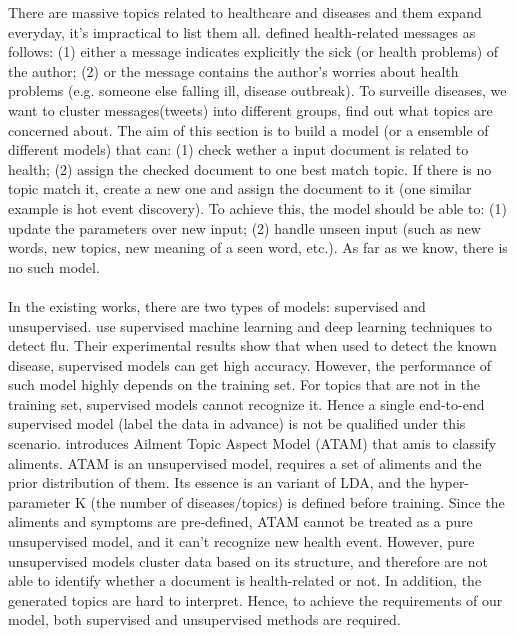 \label{sec:uncoverig}
There are massive topics related to healthcare and diseases and them expand everyday, it's impractical to list them all. \cite{tuarob2013discovering} defined health-related messages as follows: (1) either a message indicates explicitly the sick (or health problems) of the author; (2) or the message contains the author's worries about health problems (e.g. someone else falling ill, disease outbreak). To surveille diseases, we want to cluster messages(tweets) into different groups, find out what topics are concerned about. The aim of this section is to build a model (or a ensemble of different models) that can: (1) check wether a input document is related to health; (2) assign the checked document to one best match topic. If there is no topic match it, create a new one and assign the document to it (one similar example is hot event discovery). To achieve this, the model should be able to: (1) update the parameters over new input; (2) handle unseen input (such as new words, new topics, new meaning of a seen word, etc.). As far as we know, there is no such model.
\\\\
In the existing works, there are two types of models: supervised and unsupervised. \cite{serban2019real,aramaki2011twitter,lampos2010flu,chen2017disease} use supervised machine learning and deep learning techniques to detect flu. Their experimental results show that when used to detect the known disease, supervised models can get high accuracy. However, the performance of such model highly depends on the training set. For topics that are not in the training set, supervised models cannot recognize it. 
Hence a single end-to-end supervised model (label the data in advance) is not be qualified under this scenario. \cite{paul2012model} introduces Ailment Topic Aspect Model (ATAM) that amis to classify aliments. ATAM is an unsupervised model, requires a set of aliments and the prior distribution of them. Its essence is an variant of LDA, and the hyper-parameter K (the number of diseases/topics) is defined before training. Since the aliments and symptoms are pre-defined, ATAM cannot be treated as a pure unsupervised model, and it can't recognize new health event. However, pure unsupervised models cluster data based on its structure, and therefore are not able to identify whether a document is health-related or not. In addition, the generated topics are hard to interpret. Hence, to achieve the requirements of our model, both supervised and unsupervised methods are required.
\\\\
